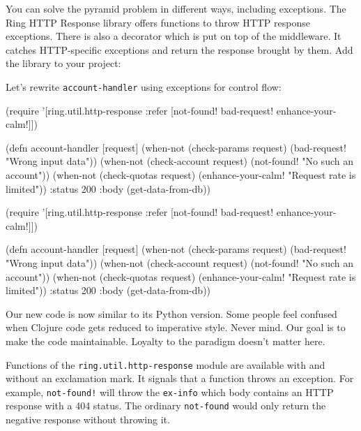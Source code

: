 
You can solve the pyramid problem in different ways, including exceptions. The Ring HTTP Response library offers functions to throw HTTP response exceptions. There is also a decorator which is put on top of the middleware. It catches HTTP-specific exceptions and return the response brought by them. Add the library to your project:

\begin{clojure}
\end{clojure}

Let's rewrite \verb|account-handler| using exceptions for control flow:


\ifnarrow

\begin{clojure}
(require '[ring.util.http-response
           :refer [not-found!
                   bad-request!
                   enhance-your-calm!]])

(defn account-handler [request]
  (when-not (check-params request)
    (bad-request! "Wrong input data"))
  (when-not (check-account request)
    (not-found! "No such an account"))
  (when-not (check-quotas request)
    (enhance-your-calm!
      "Request rate is limited"))
  {:status 200
   :body (get-data-from-db)})
\end{clojure}

\else

\begin{clojure}
(require '[ring.util.http-response
           :refer [not-found!
                   bad-request!
                   enhance-your-calm!]])

(defn account-handler [request]
  (when-not (check-params request)
    (bad-request! "Wrong input data"))
  (when-not (check-account request)
    (not-found! "No such an account"))
  (when-not (check-quotas request)
    (enhance-your-calm! "Request rate is limited"))
  {:status 200
   :body (get-data-from-db)})
\end{clojure}

\fi

Our new code is now similar to its Python version. Some people feel confused when Clojure code gets reduced to imperative style. Never mind. Our goal is to make the code maintainable. Loyalty to the paradigm doesn't matter here.

Functions of the \texttt{ring.util.http\--res\-ponse} module are available with and without an exclamation mark. It signals that a function throws an exception. For example, \verb|not-found!| will throw the \verb|ex-info| which body contains an HTTP response with a 404 status. The ordinary \verb|not-found| would only return the negative response without throwing it.

